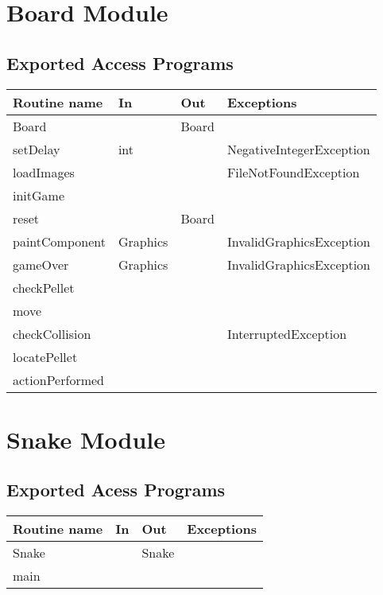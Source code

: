 \documentclass[12pt]{article}
\begin{document}
\section* {Board Module}

\subsection* {Exported Access Programs}

\begin{tabular}{| l | p{5cm} | l | l |}
\hline
\textbf{Routine name} & \textbf{In} & \textbf{Out} & \textbf{Exceptions}\\
\hline
Board & ~ & Board & ~\\
\hline
setDelay & int & ~ & NegativeIntegerException\\
\hline
loadImages & ~ & ~ & FileNotFoundException\\
\hline
initGame & ~ & ~ & ~\\
\hline
reset & ~ & Board & ~\\
\hline
paintComponent & Graphics & ~ & InvalidGraphicsException\\
\hline
gameOver & Graphics & ~ & InvalidGraphicsException\\
\hline
checkPellet & ~ & ~ & ~\\
\hline
move & ~ & ~ & ~\\
\hline
checkCollision & ~ & ~ & InterruptedException\\
\hline
locatePellet & ~ & ~ & ~\\
\hline
actionPerformed & ~ & ~ & ~\\
\hline
\end{tabular}


\section* {Snake Module}
\subsection* {Exported Acess Programs}

\begin{tabular}{| l | p{5cm} | l | l |}
\hline
\textbf{Routine name} & \textbf{In} & \textbf{Out} & \textbf{Exceptions}\\
\hline
Snake & ~ & Snake & ~\\
\hline
main & ~ & ~ & ~\\
\hline
\end{tabular}
\end{document}
